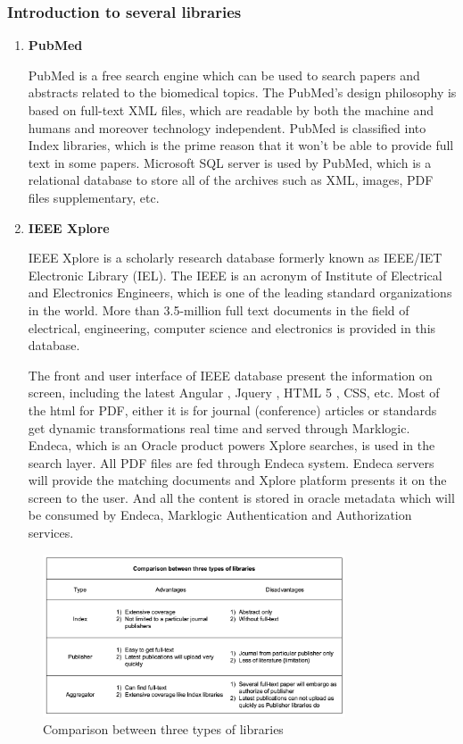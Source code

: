 \subsubsection{Introduction to several libraries }
\begin{enumerate}
	\item\textbf{PubMed}
	\setlength{\parindent}{2em}
		
	 PubMed is a free search engine which can be used to search papers and abstracts related to the biomedical topics. The PubMed’s design philosophy is based on full-text XML files, which are readable by both the machine and humans and moreover technology independent. PubMed is classified into Index libraries, which is the prime reason that it won’t be able to provide full text in some papers. Microsoft SQL server is used by PubMed, which is a relational database to store all of the archives such as XML, images, PDF files supplementary, etc.
	
	\item\textbf{IEEE Xplore}
	\setlength{\parindent}{2em}
	
	IEEE Xplore is a scholarly research database formerly known as IEEE/IET Electronic Library (IEL). The IEEE is an acronym of Institute of Electrical and Electronics Engineers, which is one of the leading standard organizations in the world. More than 3.5-million full text documents in the field of electrical, engineering, computer science and electronics is provided in this database. 
	
	The front and user interface of IEEE database present the information on screen, including the latest Angular , Jquery , HTML 5 , CSS, etc. Most of the html for PDF, either it is for journal (conference) articles or standards get dynamic transformations real time and served through Marklogic. Endeca, which is an Oracle product powers Xplore searches, is used in the search layer. All PDF files are fed through Endeca system. Endeca servers will provide the matching documents and Xplore platform presents it on the screen to the user. And all the content is stored in oracle metadata which will be consumed by Endeca, Marklogic Authentication and Authorization services.
	
\end{enumerate}

\begin{figure}[htb]
	\begin{center}
		\includegraphics[width=0.8\textwidth]{WolverineChart3}
	\end{center}
	\caption{Comparison between three types of libraries}
\end{figure}
\newpage
